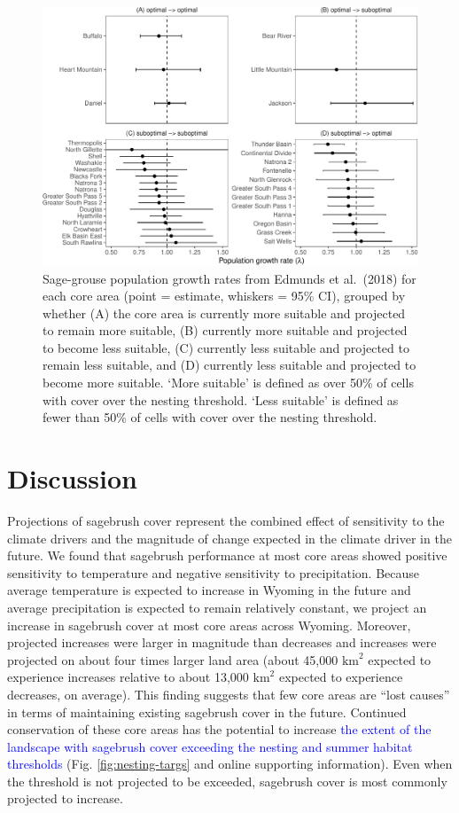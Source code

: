 \documentclass[
  12pt,
]{article}
\begin{document}
\begin{figure}
\centering
\includegraphics{sageCastManuscript_files/figure-latex/lambda-compares-1.pdf}
\caption{\label{fig:lambda-compares}Sage-grouse population growth rates from Edmunds et al.~(2018) for each core area (point = estimate, whiskers = 95\% CI), grouped by whether (A) the core area is currently more suitable and projected to remain more suitable, (B) currently more suitable and projected to become less suitable, (C) currently less suitable and projected to remain less suitable, and (D) currently less suitable and projected to become more suitable. `More suitable' is defined as over 50\% of cells with cover over the nesting threshold. `Less suitable' is defined as fewer than 50\% of cells with cover over the nesting threshold.}
\end{figure}

\hypertarget{discussion}{%
\section{Discussion}\label{discussion}}

Projections of sagebrush cover represent the combined effect of sensitivity to the climate drivers and the magnitude of change expected in the climate driver in the future.
We found that sagebrush performance at most core areas showed positive sensitivity to temperature and negative sensitivity to precipitation.
Because average temperature is expected to increase in Wyoming in the future and average precipitation is expected to remain relatively constant, we project an increase in sagebrush cover at most core areas across Wyoming.
Moreover, projected increases were larger in magnitude than decreases and increases were projected on about four times larger land area (about 45,000 \(\text{km}^2\) expected to experience increases relative to about 13,000 \(\text{km}^2\) expected to experience decreases, on average).
This finding suggests that few core areas are ``lost causes'' in terms of maintaining existing sagebrush cover in the future.
Continued conservation of these core areas has the potential to increase \textcolor{blue}{the extent of the landscape with sagebrush cover exceeding the nesting and summer habitat thresholds} (Fig. \ref{fig:nesting-targs} and online supporting information).
Even when the threshold is not projected to be exceeded, sagebrush cover is most commonly projected to increase.
\end{document}
